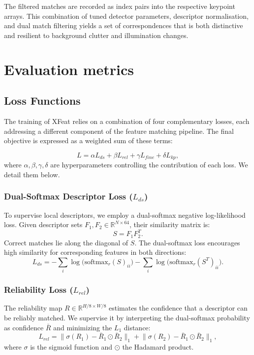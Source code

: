 The filtered matches are recorded as index pairs into the respective keypoint
arrays. This combination of tuned detector parameters, descriptor
normalisation, and dual match filtering yields a set of correspondences that is
both distinctive and resilient to background clutter and illumination changes.
\section{Evaluation metrics}
\subsection{Loss Functions}

The training of XFeat relies on a combination of four complementary losses,
each addressing a different component of the feature matching pipeline. The
final objective is expressed as a weighted sum of these terms:

\begin{equation}
    L = \alpha L_{ds} + \beta L_{rel} + \gamma L_{fine} + \delta L_{kp},
\end{equation}
where $\alpha, \beta, \gamma, \delta$ are hyperparameters controlling the contribution of each loss. We detail them below.

\subsubsection{Dual-Softmax Descriptor Loss ($L_{ds}$)}
To supervise local descriptors, we employ a dual-softmax negative log-likelihood loss.
Given descriptor sets $F_1, F_2 \in \mathbb{R}^{N \times 64}$, their similarity matrix is:
\begin{equation}
    S = F_1 F_2^{T}.
\end{equation}
Correct matches lie along the diagonal of $S$. The dual-softmax loss encourages high similarity for corresponding features in both directions:
\begin{equation}
    L_{ds} = - \sum_i \log \big( \text{softmax}_r(S)_{ii} \big)
    - \sum_i \log \big( \text{softmax}_r(S^T)_{ii} \big).
\end{equation}

\subsubsection{Reliability Loss ($L_{rel}$)}
The reliability map $R \in \mathbb{R}^{H/8 \times W/8}$ estimates the confidence that a descriptor can be reliably matched.
We supervise it by interpreting the dual-softmax probability as confidence $\bar{R}$ and minimizing the $L_1$ distance:
\begin{equation}
    L_{rel} = \lVert \sigma(R_1) - \bar{R}_1 \odot \bar{R}_2 \rVert_1 +
    \lVert \sigma(R_2) - \bar{R}_1 \odot \bar{R}_2 \rVert_1,
\end{equation}
where $\sigma$ is the sigmoid function and $\odot$ the Hadamard product.

